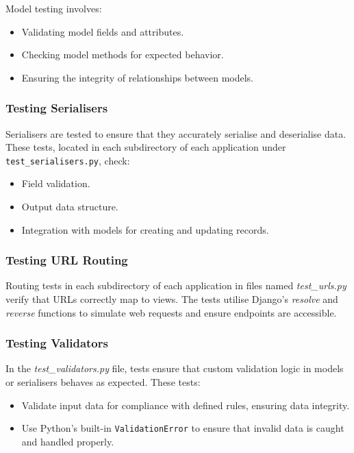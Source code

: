 Model testing involves:
\begin{itemize}
    \item Validating model fields and attributes.
    \item Checking model methods for expected behavior.
    \item Ensuring the integrity of relationships between models.
\end{itemize}

\subsubsection{Testing Serialisers}

Serialisers are tested to ensure that they accurately serialise and deserialise data. These tests, located in each subdirectory of each application under \texttt{test\_serialisers.py}, check:
\begin{itemize}
    \item Field validation.
    \item Output data structure.
    \item Integration with models for creating and updating records.
\end{itemize}

\subsubsection{Testing URL Routing}

Routing tests in each subdirectory of each application in files named \textit{test\_urls.py} verify that URLs correctly map to views. The tests utilise Django's \textit{resolve} and \textit{reverse} functions to simulate web requests and ensure endpoints are accessible.

\subsubsection{Testing Validators}

In the \textit{test\_validators.py} file, tests ensure that custom validation logic in models or serialisers behaves as expected. These tests:

\begin{itemize}
    \item Validate input data for compliance with defined rules, ensuring data integrity.
    \item Use Python's built-in \texttt{ValidationError} to ensure that invalid data is caught and handled properly.
\end{itemize}

